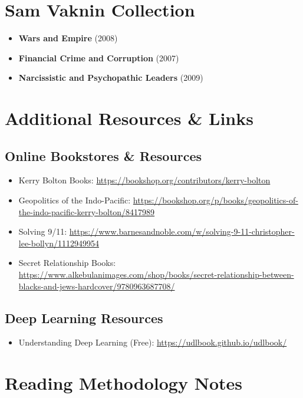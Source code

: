 \documentclass[11pt,a4paper]{article}
\begin{document}
\section{Sam Vaknin Collection}

\begin{itemize}
  \item \textbf{Wars and Empire} (2008)
  \item \textbf{Financial Crime and Corruption} (2007)
  \item \textbf{Narcissistic and Psychopathic Leaders} (2009)
\end{itemize}

\section{Additional Resources \& Links}

\subsection{Online Bookstores \& Resources}
\begin{itemize}
  \item Kerry Bolton Books: \url{https://bookshop.org/contributors/kerry-bolton}
  \item Geopolitics of the Indo-Pacific: \url{https://bookshop.org/p/books/geopolitics-of-the-indo-pacific-kerry-bolton/8417989}
  \item Solving 9/11: \url{https://www.barnesandnoble.com/w/solving-9-11-christopher-lee-bollyn/1112949954}
  \item Secret Relationship Books: \url{https://www.alkebulanimages.com/shop/books/secret-relationship-between-blacks-and-jews-hardcover/9780963687708/}
\end{itemize}

\subsection{Deep Learning Resources}
\begin{itemize}
  \item Understanding Deep Learning (Free): \url{https://udlbook.github.io/udlbook/}
\end{itemize}

\section{Reading Methodology Notes}
\end{document}
